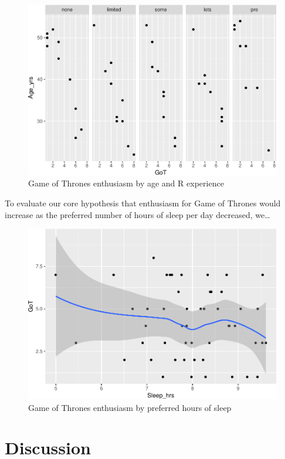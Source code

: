 \documentclass[english,man]{apa6}
\theoremstyle{definition}
\theoremstyle{definition}
\theoremstyle{remark}
\begin{document}
\begin{figure}[htbp]
\centering
\includegraphics{gilmore-lebreton-hallquist_files/figure-latex/unnamed-chunk-1-1.pdf}
\caption{\label{fig:unnamed-chunk-1}Game of Thrones enthusiasm by age and R
experience}
\end{figure}

To evaluate our core hypothesis that enthusiasm for Game of Thrones
would increase as the preferred number of hours of sleep per day
decreased, we\ldots{}

\begin{figure}[htbp]
\centering
\includegraphics{gilmore-lebreton-hallquist_files/figure-latex/unnamed-chunk-2-1.pdf}
\caption{\label{fig:unnamed-chunk-2}Game of Thrones enthusiasm by preferred
hours of sleep}
\end{figure}

\section{Discussion}\label{discussion}
\end{document}
